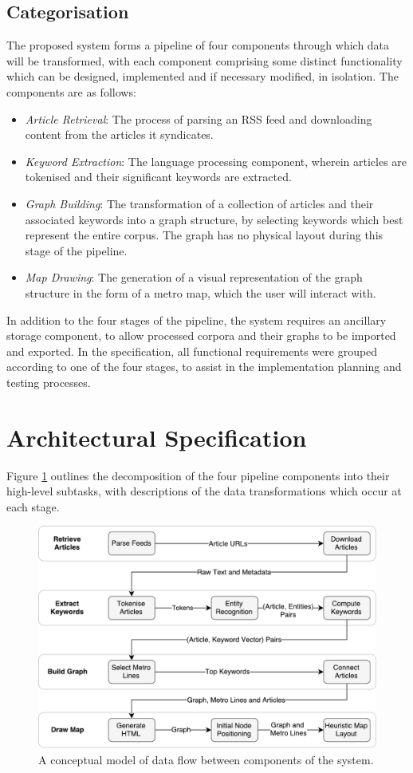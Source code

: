\subsection{Categorisation}
The proposed system forms a pipeline of four components through which data will be transformed, with each component comprising some distinct functionality which can be designed, implemented and if necessary modified, in isolation. The components are as follows:
\begin{itemize}[itemsep=0.1em]
	\item \textit{Article Retrieval}: The process of parsing an RSS feed and downloading content from the articles it syndicates.
	\item \textit{Keyword Extraction}: The language processing component, wherein articles are tokenised and their significant keywords are extracted.
	\item \textit{Graph Building}: The transformation of a collection of articles and their associated keywords into a graph structure, by selecting keywords which best represent the entire corpus. The graph has no physical layout during this stage of the pipeline.
	\item \textit{Map Drawing}: The generation of a visual representation of the graph structure in the form of a metro map, which the user will interact with.
\end{itemize}
In addition to the four stages of the pipeline, the system requires an ancillary storage component, to allow processed corpora and their graphs to be imported and exported. In the specification, all functional requirements were grouped according to one of the four stages, to assist in the implementation planning and testing processes.

\section{Architectural Specification}
Figure \ref{fig:dfp} outlines the decomposition of the four pipeline components into their high-level subtasks, with descriptions of the data transformations which occur at each stage.

\begin{figure}[htbp!]
	\centering
	\includegraphics[width=\textwidth]{img/design/DataFlow.pdf}
	\caption{A conceptual model of data flow between components of the system.}
	\label{fig:dfp}
\end{figure}

